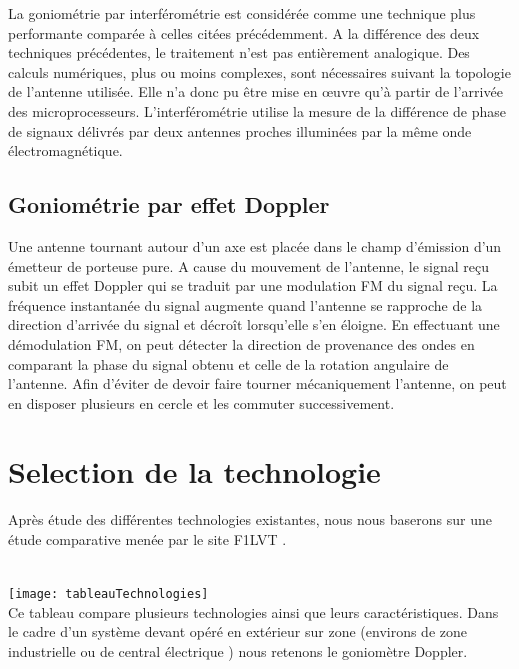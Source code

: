 	La goniométrie par interférométrie est considérée comme une technique plus performante comparée à celles citées précédemment. A la différence des deux techniques précédentes, le traitement n’est pas entièrement analogique. Des calculs numériques, plus ou moins complexes, sont nécessaires suivant la topologie de l’antenne utilisée. Elle n’a donc pu être mise en œuvre qu’à partir de l’arrivée des microprocesseurs.
L’interférométrie utilise la mesure de la différence de phase de signaux délivrés par deux antennes proches illuminées par la même onde électromagnétique.

\subsection{Goniométrie par effet Doppler}

	Une antenne tournant autour d'un axe est placée dans le champ d'émission d'un émetteur de porteuse pure. A cause du mouvement de l'antenne, le signal reçu subit un effet Doppler qui se traduit par une modulation FM du signal reçu. La fréquence instantanée du signal augmente quand l’antenne se rapproche de la direction d’arrivée du signal et décroît lorsqu’elle s’en éloigne. En effectuant une démodulation FM, on peut détecter la direction de provenance des ondes en comparant la phase du signal obtenu et celle de la rotation angulaire de l’antenne. 
Afin d'éviter de devoir faire tourner mécaniquement l'antenne, on peut en disposer plusieurs en cercle et les commuter successivement.

\section{Selection de la technologie}

	Après étude des différentes technologies existantes, nous nous baserons sur une étude comparative menée par le site F1LVT \cite{montreal}.

~\\	
	\texttt{[image: tableauTechnologies]}
\parindent=15pt
~\\

	Ce tableau compare plusieurs technologies ainsi que leurs caractéristiques. Dans le cadre d’un système devant opéré en extérieur sur zone (environs de zone industrielle ou de central électrique ) nous retenons le goniomètre Doppler.

~\\


